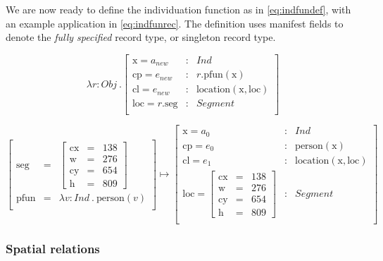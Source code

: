 \documentclass[11pt, a4paper]{article}
\begin{document}
We are now ready to define the individuation function as in \autoref{eq:indfundef}, with an example application in \autoref{eq:indfunrec}.
The definition uses manifest fields to denote the \textit{fully specified} record type, or singleton record type.

\begin{equation}\label{eq:indfundef}
\lambda r : Obj\ . \left[\begin{array}{lcl}
    \text{x} = a_{new} &:& Ind \\
    \text{cp} = e_{new} &:& r.\text{pfun}(\text{x}) \\
    \text{cl} = e_{new} &:& \text{location}(\text{x}, \text{loc}) \\
    \text{loc} = r.\text{seg} &:& Segment\\
\end{array}\right]
\end{equation}

\begin{equation}\label{eq:indfunrec}
\left[\begin{array}{rcl}
\text{seg} &=& \left[\begin{array}{rcl}
\text{cx} &=& 138\\
\text{w} &=& 276\\
\text{cy} &=& 654\\
\text{h} &=& 809
\end{array}\right]\\
\text{pfun} &=& \lambda v:Ind\ .\ \text{person}(v)\\
\end{array}\right]
\mapsto
\left[\begin{array}{lcl}
    \text{x} = a_0 &:& Ind \\
    \text{cp} = e_0 &:& \text{person}(\text{x}) \\
    \text{cl} = e_1 &:& \text{location}(\text{x}, \text{loc}) \\
    \text{loc} = \left[\begin{array}{rcl}
\text{cx} &=& 138\\
\text{w} &=& 276\\
\text{cy} &=& 654\\
\text{h} &=& 809
\end{array}\right] &:& Segment\\
\end{array}\right]
\end{equation}



\subsubsection{Spatial relations}
\end{document}
